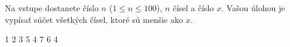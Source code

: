 




Na vstupe dostanete číslo $n$ ($1\leq n \leq 100$), $n$ čísel a číslo $x$. Vašou úlohou je vypísať súčet
všetkých čísel, ktoré sú menšie ako $x$.

1 2 3 5 4 7 6
4
\koniec


